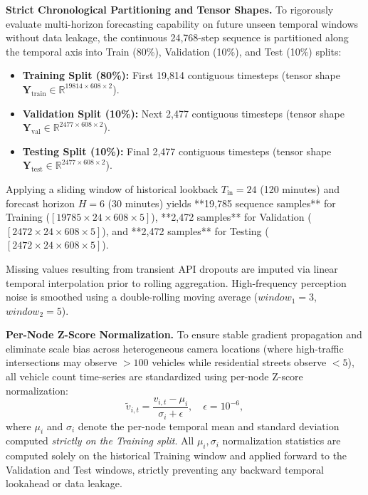 \documentclass[a4paper,fleqn]{cas-sc}
\begin{document}
\textbf{Strict Chronological Partitioning and Tensor Shapes.} To rigorously evaluate multi-horizon forecasting capability on future unseen temporal windows without data leakage, the continuous 24,768-step sequence is partitioned along the temporal axis into Train (80\%), Validation (10\%), and Test (10\%) splits:
\begin{itemize}
    \item \textbf{Training Split (80\%):} First 19,814 contiguous timesteps (tensor shape $\mathbf{Y}_{\text{train}} \in \mathbb{R}^{19814 \times 608 \times 2}$).
    \item \textbf{Validation Split (10\%):} Next 2,477 contiguous timesteps (tensor shape $\mathbf{Y}_{\text{val}} \in \mathbb{R}^{2477 \times 608 \times 2}$).
    \item \textbf{Testing Split (10\%):} Final 2,477 contiguous timesteps (tensor shape $\mathbf{Y}_{\text{test}} \in \mathbb{R}^{2477 \times 608 \times 2}$).
\end{itemize}

Applying a sliding window of historical lookback $T_{\text{in}} = 24$ (120 minutes) and forecast horizon $H = 6$ (30 minutes) yields **19,785 sequence samples** for Training ($[19785 \times 24 \times 608 \times 5]$), **2,472 samples** for Validation ($[2472 \times 24 \times 608 \times 5]$), and **2,472 samples** for Testing ($[2472 \times 24 \times 608 \times 5]$).

Missing values resulting from transient API dropouts are imputed via linear temporal interpolation prior to rolling aggregation. High-frequency perception noise is smoothed using a double-rolling moving average ($window_1=3$, $window_2=5$).

\textbf{Per-Node Z-Score Normalization.} To ensure stable gradient propagation and eliminate scale bias across heterogeneous camera locations (where high-traffic intersections may observe $>100$ vehicles while residential streets observe $<5$), all vehicle count time-series are standardized using per-node Z-score normalization:
\begin{equation}
\tilde{v}_{i,t} = \frac{v_{i,t} - \mu_i}{\sigma_i + \epsilon}, \quad \epsilon = 10^{-6},
\end{equation}
where $\mu_i$ and $\sigma_i$ denote the per-node temporal mean and standard deviation computed \emph{strictly on the Training split}. All $\mu_i, \sigma_i$ normalization statistics are computed solely on the historical Training window and applied forward to the Validation and Test windows, strictly preventing any backward temporal lookahead or data leakage.
\end{document}
